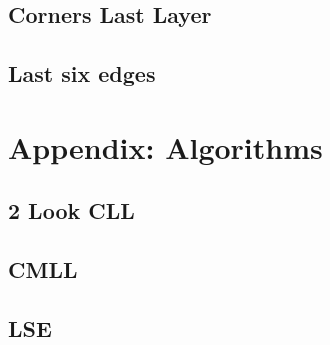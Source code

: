 \documentclass[a4paper]{scrreprt}
\begin{document}
\section{Corners Last Layer}

\section{Last six edges}


\chapter{Appendix: Algorithms}

\section{2 Look CLL}

\section{CMLL}

\section{LSE}
\end{document}
